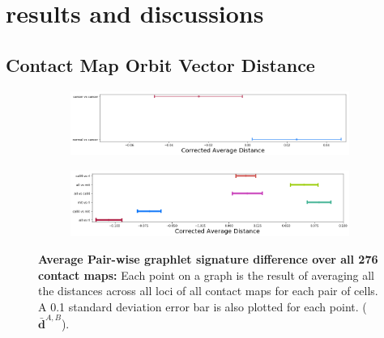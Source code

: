 \documentclass[]{article}
\begin{document}
\section{results and discussions}
\subsection{Contact Map Orbit Vector Distance}
\begin{figure}
    \centering
    \begin{subfigure}[b]{\textwidth}
        \includegraphics[width=\textwidth]{figures/orbit_distances_normal_vs_cancer.png}
        \caption{}
        \label{fig:orbit_distances_all_a}
    \end{subfigure}

    \begin{subfigure}[b]{\textwidth}
        \includegraphics[width=\textwidth]{figures/orbit_distances_cells.png}
        \caption{}
        \label{fig:orbit_distances_all_b}
    \end{subfigure}

    \caption{   
        \textbf{Average Pair-wise graphlet signature difference 
        over all 276 contact maps:}
        Each point on a graph is the result of averaging all
        the distances across all loci of all contact maps for 
        each pair of cells. A 0.1 standard deviation error
        bar is also plotted for each point.
        ($\bar{\mathbf{d}}^{\scriptscriptstyle A,B}$).  
     }
    \label{fig:orbit_distances_all}
\end{figure}
\end{document}
